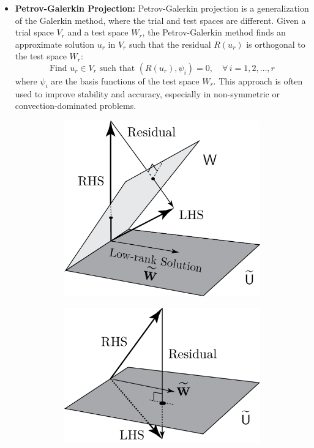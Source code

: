 \documentclass[11pt]{article}
\begin{document}
\begin{itemize}
    \item \textbf{Petrov-Galerkin Projection:} Petrov-Galerkin projection is a generalization of the Galerkin method, where the trial and test spaces are different. Given a trial space \( V_r \) and a test space \( W_r \), the Petrov-Galerkin method finds an approximate solution \( u_r \) in \( V_r \) such that the residual \( R(u_r) \) is orthogonal to the test space \( W_r \):
    \[
    \text{Find } u_r \in V_r \text{ such that } \left( R(u_r), \psi_i \right) = 0, \quad \forall \, i = 1, 2, \ldots, r
    \]
    where \( \psi_i \) are the basis functions of the test space \( W_r \). This approach is often used to improve stability and accuracy, especially in non-symmetric or convection-dominated problems.

    \begin{figure}[t]
    \centering
    \begin{subfigure}[b]{0.35\linewidth}
    \centering
    \includegraphics[width=\linewidth]{PG.png}
    \caption{}
    \label{fig:projections_PG}
    \end{subfigure}\hfill
    \begin{subfigure}[b]{0.35\linewidth}
    \centering
    \includegraphics[width=\linewidth]{G.png}

\end{subfigure}
\end{figure}
\end{itemize}
\end{document}
